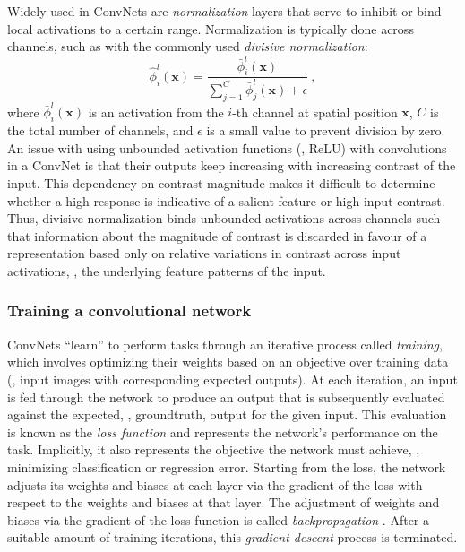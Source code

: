 Widely used in ConvNets are \emph{normalization} layers that serve to inhibit or bind local activations to a certain range. Normalization is typically done across channels, such as with the commonly used \emph{divisive normalization}:
\begin{equation}
	\hat{\phi}^l_i(\mathbf{x}) = \frac{\bar{\phi}^l_i(\mathbf{x})}{\sum_{j=1}^{C}{\bar{\phi}^l_j(\mathbf{x})} + \epsilon}\ ,
\end{equation}
where $\bar{\phi}^l_i(\mathbf{x})$ is an activation from the $i$-th channel at spatial position $\mathbf{x}$, $C$ is the total number of channels, and $\epsilon$ is a small value to prevent division by zero.
An issue with using unbounded activation functions (\eg, ReLU) with convolutions in a ConvNet is that their outputs keep increasing with increasing contrast of the input. This dependency on contrast magnitude makes it difficult to determine whether a high response is indicative of a salient feature or high input contrast. Thus, divisive normalization binds unbounded activations across channels such that information about the magnitude of contrast is discarded in favour of a representation based only on relative variations in contrast across input activations, \ie, the underlying feature patterns of the input.

\subsubsection{Training a convolutional network}

ConvNets ``learn'' to perform tasks through an iterative process called \emph{training}, which involves optimizing their weights based on an objective over training data (\eg, input images with corresponding expected outputs). At each iteration, an input is fed through the network to produce an output that is subsequently evaluated against the expected, \ie, groundtruth, output for the given input. This evaluation is known as the \emph{loss function} and represents the network's performance on the task. Implicitly, it also represents the objective the network must achieve, \eg, minimizing classification or regression error. Starting from the loss, the network adjusts its weights and biases at each layer via the gradient of the loss with respect to the weights and biases at that layer. The adjustment of weights and biases via the gradient of the loss function is called \emph{backpropagation} \cite{goodfellow2016}. After a suitable amount of training iterations, this \emph{gradient descent} process is terminated.

